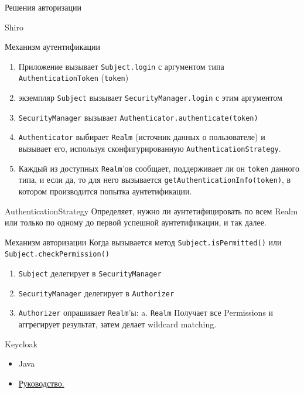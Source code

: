 \documentclass[presentation]{beamer}
\begin{document}
\begin{frame}[label={sec:org24b9295},fragile]{Решения авторизации}
\begin{block}{Shiro}
\begin{block}{Механизм аутентификации}
\begin{enumerate}
\item Приложение вызывает \texttt{Subject.login} с аргументом типа \texttt{AuthenticationToken} (\texttt{token})
\item экземпляр \texttt{Subject} вызывает \texttt{SecurityManager.login} с этим аргументом
\item \texttt{SecurityManager} вызывает \texttt{Authenticator.authenticate(token)}
\item \texttt{Authenticator} выбирает \texttt{Realm} (источник данных о пользователе) и вызывает его, используя сконфигурированную \texttt{AuthenticationStrategy}.
\item Каждый из доступных \texttt{Realm}'ов сообщает, поддерживает ли он \texttt{token} данного типа, и если да, то для него вызывается \texttt{getAuthenticationInfo(token)}, в котором производится попытка аунтетификации.
\end{enumerate}


\begin{block}{AuthenticationStrategy}
Определяет, нужно ли аунтетифицировать по всем Realm или только по одному до первой успешной аунтетификации, и так далее.
\end{block}
\end{block}

\begin{block}{Механизм авторизации}
Когда вызывается метод \texttt{Subject.isPermitted()} или \texttt{Subject.checkPermission()}

\begin{enumerate}
\item \texttt{Subject} делегирует в \texttt{SecurityManager}
\item \texttt{SecurityManager} делегирует в \texttt{Authorizer}
\item \texttt{Authorizer} опрашивает \texttt{Realm}'ы:
a. \texttt{Realm} Получает все Permissions и аггрегирует результат, затем делает wildcard matching.
\end{enumerate}
\end{block}
\end{block}




\begin{block}{Keycloak}
\begin{itemize}
\item Java
\item \href{https://www.keycloak.org/docs/latest/authorization\_services/}{Руководство.}
\end{itemize}


\end{block}
\end{frame}
\end{document}
